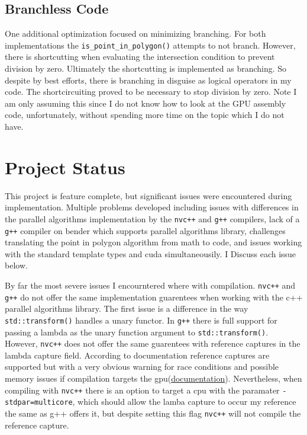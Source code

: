 \documentclass{article}
\begin{document}
\subsection{Branchless Code}
One additional optimization focused on minimizing branching. For both implementations the \texttt{is\_point\_in\_polygon()} attempts to not branch. However, there is shortcutting when evaluating the intersection condition to prevent division by zero. Ultimately the shortcutting is implemented as branching. So despite by best efforts, there is branching in disguise as logical operators in my code. The shortcircuiting proved to be necessary to stop division by zero. Note I am only assuming this since I do not know how to look at the GPU assembly code, unfortunately, without spending more time on the topic which I do not have.

\section{Project Status}
This project is feature complete, but significant issues were encountered during implementation. Multiple problems developed including issues with differences in the parallel algorithms implementation by the \texttt{nvc++} and \texttt{g++} compilers, lack of a \texttt{g++} compiler on bender which supports parallel algorithms library, challenges translating the point in polygon algorithm from math to code, and issues working with the standard template types and cuda simultaneousily. I Discuss each issue below.

By far the most severe issues I encourntered where with compilation. \texttt{nvc++} and \texttt{g++} do not offer the same implementation guarentees when working with the c++ parallel algorithms library. The first issue is a difference in the way \texttt{std::transform()} handles a unary functor. In \texttt{g++} there is full support for passing a lambda as the unary function argument to \texttt{std::transform()}. However, \texttt{nvc++} does not offer the same guarentees with reference captures in the lambda capture field. According to documentation reference captures are supported but with a very obvious warning for race conditions and possible memory issues if compilation targets the gpu(\href{https://docs.nvidia.com/hpc-sdk/archive/21.1/compilers/c++-parallel-algorithms/}{documentation}). Nevertheless, when compiling with \texttt{nvc++} there is an option to target a cpu with the paramater \texttt{-stdpar=multicore}, which should allow the lamba capture to occur my reference the same as g++ offers it, but despite setting this flag \texttt{nvc++} will not compile the reference capture. 
\end{document}
